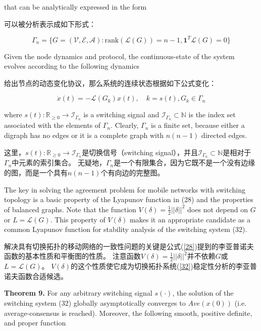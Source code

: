 \documentclass{article}
\begin{document}
{\color[gray]{0.5}
\noindent that can be analytically expressed in the form
}

\noindent 可以被分析表示成如下形式：

\begin{equation}
    \Gamma_n = \{ G=(\mathcal{V}, \mathcal{E}, \mathcal{A}): \text{rank}(\mathcal{L}(G)) =n-1, \mathbf{1}^T\mathcal{L}(G) = 0\}
    \tag{31}
    \label{31}
\end{equation}

{\color[gray]{0.5}
\noindent Given the node dynamics and protocol, the continuous-state of the system evolves according to the following dynamics
}

\noindent 给出节点的动态变化协议，那么系统的连续状态根据如下公式变化：

\begin{equation}
    \dot{x}(t) = -\mathcal{L}(G_k)x(t),\quad k=s(t), G_k\in \Gamma_n
    \tag{32}
    \label{32}
\end{equation}

{\color[gray]{0.5}
\noindent where $s(t): \mathbb{R}_{\ge 0}\rightarrow \mathcal{I}_{\Gamma_n}$ is a switching signal and $\mathcal{I}_{\Gamma_n}\subset \mathbb{N}$ is the index set associated with the elements of $\Gamma_n$. 
Clearly, $\Gamma_n$ is a ﬁnite set, because either a digraph has no edges or it is a complete graph with $n(n-1)$ directed edges.
}

\noindent 这里，$s(t): \mathbb{R}_{\ge 0}\rightarrow \mathcal{I}_{\Gamma_n}$是切换信号（switching signal），并且$\mathcal{I}_{\Gamma_n}\subset \mathbb{N}$是相对于$\Gamma_n$中元素的索引集合。
无疑地，$\Gamma_n$是一个有限集合，因为它既不是一个没有边缘的图，而是一个具有$n(n-1)$个有向边的完整图。

{\color[gray]{0.5}
The key in solving the agreement problem for mobile networks with switching topology is a basic property of the Lyapunov function in (28) and the properties of balanced graphs. 
Note that the function $V(\delta)=\frac{1}{2}||\delta||^2$ does not depend on $G$ or $L=\mathcal{L}(G)$. 
This property of $V(\delta)$ makes it an appropriate candidate as a common Lyapunov function for stability analysis of the switching system (32).
}

解决具有切换拓扑的移动网络的一致性问题的关键是公式(\ref{28})提到的李亚普诺夫函数的基本性质和平衡图的性质。
注意函数$V(\delta)=\frac{1}{2}||\delta||^2$并不依赖$G$或$L=\mathcal{L}(G)$。
$V(\delta)$的这个性质使它成为切换拓扑系统(\ref{32})稳定性分析的李亚普诺夫函数合适候选。

{\color[gray]{0.5}
\noindent \textbf{Theorem 9.} For any arbitrary switching signal $s(\cdot)$, the solution of the switching system (32) globally asymptotically converges to $Ave(x(0))$ (i.e. average-consensus is reached). 
Moreover, the following smooth, positive deﬁnite, and proper function
}
\end{document}
